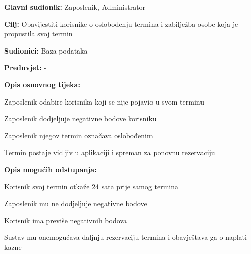 \begin{packed_item}
	
	\item \textbf{Glavni sudionik: }Zaposlenik, Administrator
	\item  \textbf{Cilj:} Obavijestiti korisnike o oslobođenju termina i zabilježba osobe koja je propustila svoj termin
	\item  \textbf{Sudionici:} Baza podataka
	\item  \textbf{Preduvjet:} -
	\item  \textbf{Opis osnovnog tijeka:}
	
	\item[] \begin{packed_enum}
		
		\item Zaposlenik odabire korisnika koji se nije pojavio u svom terminu
		\item Zaposlenik dodjeljuje negativne bodove korisniku
		\item Zaposlenik njegov termin označava oslobođenim
		\item Termin postaje vidljiv u aplikaciji i spreman za ponovnu rezervaciju
		
	\end{packed_enum}
	\item  \textbf{Opis mogućih odstupanja:}
	
	\item[] \begin{packed_item}
		
		\item[1.a] Korisnik svoj termin otkaže 24 sata prije samog termina 
		\item[] \begin{packed_enum}
			
			\item Zaposlenik mu ne dodjeljuje negativne bodove
			
		\end{packed_enum}
		\item[1.b] Korisnik ima previše negativnih bodova
		\item[] \begin{packed_enum}
			
			\item Sustav mu onemogućava daljnju rezervaciju termina i obavještava ga o naplati kazne
			
		\end{packed_enum}
		
	\end{packed_item}
\end{packed_item}
